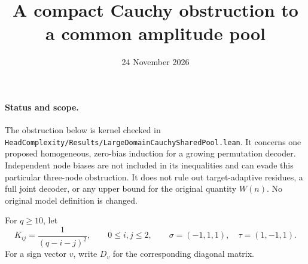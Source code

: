 \documentclass{article}
\title{A compact Cauchy obstruction to a common amplitude pool}
\date{24 November 2026}
\begin{document}
\maketitle

\paragraph{Status and scope.}
The obstruction below is kernel checked in
\texttt{HeadComplexity/Results/LargeDomainCauchySharedPool.lean}.
It concerns one proposed homogeneous, zero-bias induction for a growing
permutation decoder. Independent node biases are not included in its
inequalities and can evade this particular three-node obstruction.
It does not rule out target-adaptive residues, a full joint decoder,
or any upper bound for the original quantity $W(n)$.
No original model definition is changed.

For $q\geq10$, let
\[
 K_{ij}=\frac1{(q-i-j)^2},\qquad 0\leq i,j\leq2,
 \qquad \sigma=(-1,1,1),\quad\tau=(1,-1,1).
\]
For a sign vector $v$, write $D_v$ for the corresponding diagonal matrix.
\end{document}
